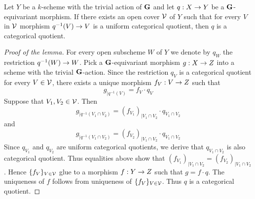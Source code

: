 \begin{lemma}\label{lemma:uniform_categorical_quotients_are_local_on_the_target}
Let $Y$ be a $k$-scheme with the trivial action of $\mathbf{G}$ and let $q:X\rightarrow Y$ be a $\mathbf{G}$-equivariant morphism. If there exists an open cover ${\mathcal V}$ of $Y$ such that for every $V$ in ${\mathcal V}$ morphism $q^{-1}(V)\rightarrow V$ is a uniform categorical quotient, then $q$ is a categorical quotient.
\end{lemma}
\begin{proof}[Proof of the lemma]
For every open subscheme $W$ of $Y$ we denote by $q_W$ the restriction $q^{-1}(W)\rightarrow W$. Pick a $\mathbf{G}$-equivariant morphism $g:X\rightarrow Z$ into a scheme with the trivial $\mathbf{G}$-action. Since the restriction $q_V$ is a categorical quotient for every $V\in {\mathcal V}$, there exists a unique morphism $f_V:V\rightarrow Z$ such that 
$$g_{\mid q^{-1}(V)} = f_V\cdot q_V$$
Suppose that $V_1,V_2\in {\mathcal V}$. Then
$$g_{\mid q^{-1}(V_1\cap V_2)} = \left(f_{V_1}\right)_{\mid V_1\cap V_2}\cdot q_{V_1\cap V_2}$$
and
$$g_{\mid q^{-1}(V_1\cap V_2)} = \left(f_{V_2}\right)_{\mid V_1\cap V_2}\cdot q_{V_1\cap V_2}$$
Since $q_{V_1}$ and $q_{V_2}$ are uniform categorical quotients, we derive that $q_{V_1\cap V_2}$ is also categorical quotient. Thus equalities above show that $\left(f_{V_1}\right)_{\mid V_1\cap V_2} = \left(f_{V_2}\right)_{\mid V_1\cap V_2}$. Hence $\{f_V\}_{V\in {\mathcal V}}$ glue to a morphism $f:Y\rightarrow Z$ such that $g= f\cdot q$. The uniqueness of $f$ follows from uniqueness of $\{f_V\}_{V\in {\mathcal V}}$. Thus $q$ is a categorical quotient.
\end{proof}

